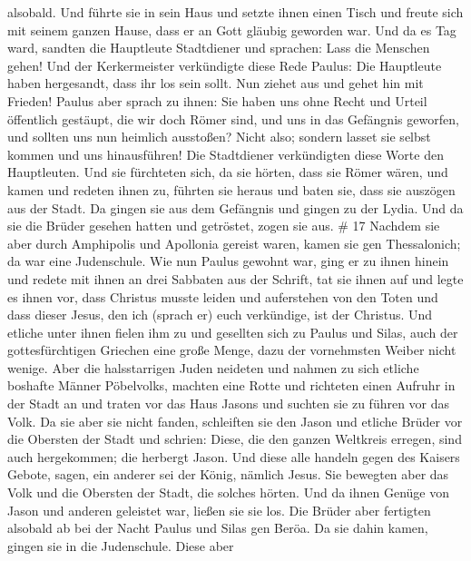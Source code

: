 alsobald.  Und führte sie in sein Haus und setzte ihnen
einen Tisch und freute sich mit seinem ganzen Hause, dass er an Gott
gläubig geworden war.  Und da es Tag ward, sandten die
Hauptleute Stadtdiener und sprachen: Lass die Menschen gehen!
 Und der Kerkermeister verkündigte diese Rede Paulus: Die
Hauptleute haben hergesandt, dass ihr los sein sollt. Nun ziehet aus und
gehet hin mit Frieden!  Paulus aber sprach zu ihnen: Sie
haben uns ohne Recht und Urteil öffentlich gestäupt, die wir doch Römer
sind, und uns in das Gefängnis geworfen, und sollten uns nun heimlich
ausstoßen? Nicht also; sondern lasset sie selbst kommen und uns
hinausführen!  Die Stadtdiener verkündigten diese Worte den
Hauptleuten. Und sie fürchteten sich, da sie hörten, dass sie Römer
wären,  und kamen und redeten ihnen zu, führten sie heraus
und baten sie, dass sie auszögen aus der Stadt.  Da gingen
sie aus dem Gefängnis und gingen zu der Lydia. Und da sie die Brüder
gesehen hatten und getröstet, zogen sie aus. \# 17  Nachdem
sie aber durch Amphipolis und Apollonia gereist waren, kamen sie gen
Thessalonich; da war eine Judenschule.  Wie nun Paulus
gewohnt war, ging er zu ihnen hinein und redete mit ihnen an drei
Sabbaten aus der Schrift,  tat sie ihnen auf und legte es
ihnen vor, dass Christus musste leiden und auferstehen von den Toten und
dass dieser Jesus, den ich (sprach er) euch verkündige, ist der
Christus.  Und etliche unter ihnen fielen ihm zu und
gesellten sich zu Paulus und Silas, auch der gottesfürchtigen Griechen
eine große Menge, dazu der vornehmsten Weiber nicht wenige. 
Aber die halsstarrigen Juden neideten und nahmen zu sich etliche
boshafte Männer Pöbelvolks, machten eine Rotte und richteten einen
Aufruhr in der Stadt an und traten vor das Haus Jasons und suchten sie
zu führen vor das Volk.  Da sie aber sie nicht fanden,
schleiften sie den Jason und etliche Brüder vor die Obersten der Stadt
und schrien: Diese, die den ganzen Weltkreis erregen, sind auch
hergekommen;  die herbergt Jason. Und diese alle handeln
gegen des Kaisers Gebote, sagen, ein anderer sei der König, nämlich
Jesus.  Sie bewegten aber das Volk und die Obersten der
Stadt, die solches hörten.  Und da ihnen Genüge von Jason
und anderen geleistet war, ließen sie sie los.  Die Brüder
aber fertigten alsobald ab bei der Nacht Paulus und Silas gen Beröa. Da
sie dahin kamen, gingen sie in die Judenschule.  Diese aber
